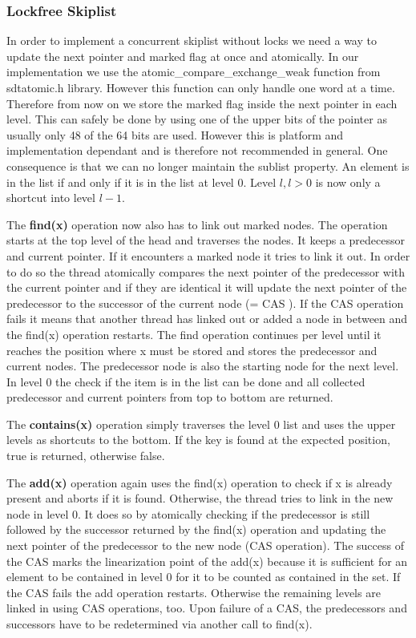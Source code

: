 \documentclass{article}
\begin{document}
\subsubsection{Lockfree Skiplist}
In order to implement a concurrent skiplist without locks we need a way to update the next pointer and marked flag at once and atomically. In our implementation we use the atomic\_compare\_exchange\_weak function from sdtatomic.h library. However this function can only handle one word at a time. Therefore from now on we store the marked flag inside the next pointer in each level. This can safely be done by using one of the upper bits of the pointer as usually only 48 of the 64 bits are used. However this is platform and implementation dependant and is therefore not recommended in general. One consequence is that we can no longer maintain the sublist property. An element is in the list if and only if it is in the list at level 0. Level $l, l > 0$ is now only a shortcut into level $l-1$.\par \medskip

\noindent The \textbf{find(x)} operation now also has to link out marked nodes. The operation starts at the top level of the head and traverses the nodes. It keeps a predecessor and current pointer. If it encounters a marked node it tries to link it out. In order to do so the thread atomically compares the next pointer of the predecessor with the current pointer and if they are identical it will update the next pointer of the predecessor to the successor of the current node (= CAS ). If the CAS operation fails it means that another thread has linked out or added a node in between and the find(x) operation restarts. The find operation continues per level until it reaches the position where x must be stored and stores the predecessor and current nodes. The predecessor node is also the starting node for the next level. In level 0 the check if the item is in the list can be done and all collected predecessor and current pointers from top to bottom are returned. \par \medskip

\noindent The \textbf{contains(x)} operation simply traverses the level 0 list and uses the upper levels as shortcuts to the bottom. If the key is found at the expected position, true is returned, otherwise false.\par \medskip

\noindent The \textbf{add(x)} operation again uses the find(x) operation to check if x is already present and aborts if it is found. Otherwise, the thread tries to link in the new node in level 0. It does so by atomically checking if the predecessor is still followed by the successor returned by the find(x) operation and updating the next pointer of the predecessor to the new node (CAS operation). The success of the CAS marks the linearization point of the add(x) because it is sufficient for an element to be contained in level 0 for it to be counted as contained in the set. If the CAS fails the add operation restarts. Otherwise the remaining levels are linked in using CAS operations, too. Upon failure of a CAS, the predecessors and successors have to be redetermined via another call to find(x). \par \medskip
\end{document}
